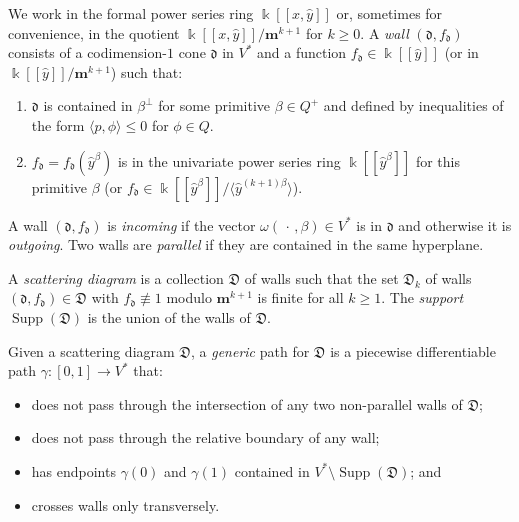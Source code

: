 \documentclass[10pt,a4paper]{amsart}
\theoremstyle{definition}
\DeclareMathOperator{\Supp}{Supp}
\newcommand{\newword}[1]{\emph{#1}}
\newcommand\llbracket{[\![}
\newcommand\rrbracket{]\!]}
\newcommand{\br}[1]{{\langle #1 \rangle}}
\newcommand{\D}{{\mathfrak D}}
\newcommand{\m}{\mathbf{m}}
\renewcommand{\k}{\Bbbk}
\renewcommand{\d}{{\mathfrak d}}
\newcommand{\hy}{\hat{y}}
\begin{document}
We work in the formal power series ring $\k\llbracket x,\hy\rrbracket $ or, sometimes for convenience, in the quotient $\k\llbracket x,\hy\rrbracket /\m^{k+1}$ for $k\ge 0$.
A \newword{wall} $(\d,f_\d)$ consists of a codimension-$1$ cone $\d$ in $V^*$ and a function $f_\d\in\k\llbracket \hy\rrbracket $ (or in $\k\llbracket \hy\rrbracket /\m^{k+1}$) such that:
\begin{enumerate}[label=(\roman*)]%
\item $\d$ is contained in $\beta^\perp$ for some primitive $\beta\in Q^+$ and defined by inequalities of the form $\br{p,\phi}\le0$ for $\phi\in Q$.
\item $f_\d=f_\d(\hy^\beta)$ is in the univariate power series ring $\k\llbracket \hy^\beta\rrbracket $ for this primitive $\beta$ (or $f_\d\in\k\llbracket \hy^\beta\rrbracket /\br{\hy^{(k+1)\beta}}$).
\end{enumerate}
A wall $(\d,f_\d)$ is \newword{incoming} if the vector $\omega(\,\cdot\,,\beta)\in V^*$ is in $\d$ and otherwise it is \newword{outgoing}.
Two walls are \newword{parallel} if they are contained in the same hyperplane.

A \newword{scattering diagram} is a collection $\D$ of walls such that the set $\D_k$ of walls $(\d,f_\d)\in\D$ with $f_\d\not\equiv 1$ modulo $\m^{k+1}$ is finite for all $k\ge 1$.
The \newword{support} $\Supp(\D)$ is the union of the walls of $\D$.

Given a scattering diagram $\D$, a \newword{generic} path for $\D$ is a piecewise differentiable path $\gamma:[0,1]\to V^*$ that:
\begin{itemize}
\item does not pass through the intersection of any two non-parallel walls of $\D$;
\item does not pass through the relative boundary of any wall;
\item has endpoints $\gamma(0)$ and $\gamma(1)$ contained in $V^*\setminus\Supp(\D)$; and
\item crosses walls only transversely.
\end{itemize}
\end{document}
